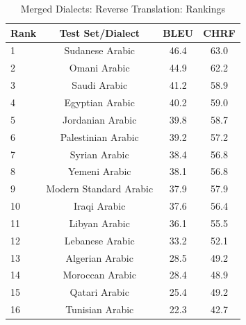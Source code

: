 \begin{table}[htbp]
\centering
\caption{Merged Dialects: Reverse Translation: Rankings}
\label{tab:testset_ranking_reverse_merged}
\begin{tabular}{l@{\hspace{3pt}}c@{\hspace{3pt}}c@{\hspace{3pt}}c}
\toprule
Rank & Test Set/Dialect & BLEU & CHRF \\
\midrule
1 & Sudanese Arabic & 46.4 & 63.0 \\
2 & Omani Arabic & 44.9 & 62.2 \\
3 & Saudi Arabic & 41.2 & 58.9 \\
4 & Egyptian Arabic & 40.2 & 59.0 \\
5 & Jordanian Arabic & 39.8 & 58.7 \\
6 & Palestinian Arabic & 39.2 & 57.2 \\
7 & Syrian Arabic & 38.4 & 56.8 \\
8 & Yemeni Arabic & 38.1 & 56.8 \\
9 & Modern Standard Arabic & 37.9 & 57.9 \\
10 & Iraqi Arabic & 37.6 & 56.4 \\
11 & Libyan Arabic & 36.1 & 55.5 \\
12 & Lebanese Arabic & 33.2 & 52.1 \\
13 & Algerian Arabic & 28.5 & 49.2 \\
14 & Moroccan Arabic & 28.4 & 48.9 \\
15 & Qatari Arabic & 25.4 & 49.2 \\
16 & Tunisian Arabic & 22.3 & 42.7 \\
\bottomrule
\end{tabular}
\end{table}